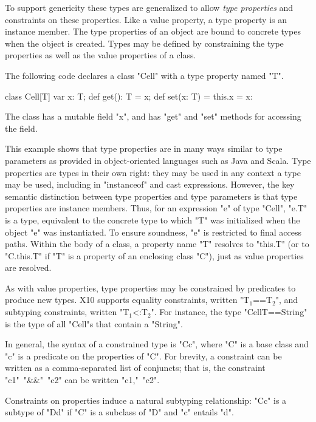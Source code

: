\documentclass[nocopyrightspace,9pt]{sigplanconf}
\begin{document}
To support genericity these types are generalized
to allow \emph{type properties} and constraints on these properties.
Like a value property, a type property is an instance member.
The type properties of an object are bound to concrete types
when the object is
created.
Types may be defined by constraining the type properties as
well as the value properties of a class.

The following code declares a class \xcd"Cell" with a type
property named \xcd"T".
\begin{xten}
class Cell[T] {
    var x: T;
    def get(): T = x;
    def set(x: T) = { this.x = x: }
}
\end{xten}
The class has a mutable field \xcd"x",
and has \xcd"get" and \xcd"set" methods for accessing the field.

This example shows that type properties are in many ways similar to
type parameters as provided in object-oriented languages such as
Java and Scala.
Type properties are types in their own right:
they may be used in any context a type may be used,
including in \xcd"instanceof" and cast expressions.
However, the key semantic distinction between type properties
and type parameters is that type properties are instance
members.
Thus, for an expression \xcd"e" of type \xcd"Cell", \xcd"e.T" is
a type, equivalent to the concrete type to which \xcd"T" was
initialized when the object \xcd"e" was instantiated. 
To ensure
soundness, \xcd"e" is restricted to final access paths.
Within the body of a class, a property name \xcd"T" resolves
to \xcd"this.T" (or to \xcd"C.this.T" if \xcd"T" is a property of
an enclosing class \xcd"C"), just as value properties are
resolved.

As with value properties, type properties may be constrained
by predicates to produce new types.
X10 supports
equality constraints, written \xcdmath"T$_1$==T$_2$", and
subtyping constraints, written \xcdmath"T$_1$<:T$_2$".
For instance, the type \xcd"Cell{T==String}" is the type of
all \xcd"Cell"s that contain a \xcd"String".

In general, the syntax of a constrained type is
\xcd"C{c}", where \xcd"C" is a base class and
\xcd"c" is a predicate on the properties of \xcd"C".
For brevity, a constraint can be written as
a comma-separated list of conjuncts; that is, the constraint
\xcd"c1"~\xcd"&&"~\xcd"c2" can be written
\xcd"c1,"~\xcd"c2".

Constraints on properties induce a natural subtyping relationship:
\xcd"C{c}" is a subtype of
\xcd"D{d}" if \xcd"C" is a subclass of \xcd"D" and
\xcd"c" entails \xcd"d".
\end{document}
